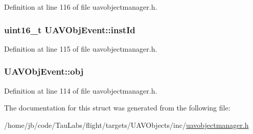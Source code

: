 \-Definition at line 116 of file uavobjectmanager.\-h.

\hypertarget{struct_u_a_v_obj_event_ad55867963dc4e2172799430c0b2323d8}{
\subsubsection[{inst\-Id}]{\setlength{\rightskip}{0pt plus 5cm}uint16\-\_\-t {\bf \-U\-A\-V\-Obj\-Event\-::inst\-Id}}}\label{struct_u_a_v_obj_event_ad55867963dc4e2172799430c0b2323d8}


\-Definition at line 115 of file uavobjectmanager.\-h.

\hypertarget{struct_u_a_v_obj_event_a716555d74d08184a3807881d9ade9232}{
\subsubsection[{obj}]{ {\bf \-U\-A\-V\-Obj\-Event\-::obj}}}\label{struct_u_a_v_obj_event_a716555d74d08184a3807881d9ade9232}


\-Definition at line 114 of file uavobjectmanager.\-h.



\-The documentation for this struct was generated from the following file\-:\begin{DoxyCompactItemize}
\item 
/home/jb/code/\-Tau\-Labs/flight/targets/\-U\-A\-V\-Objects/inc/\hyperlink{targets_2_u_a_v_objects_2inc_2uavobjectmanager_8h}{uavobjectmanager.\-h}\end{DoxyCompactItemize}
